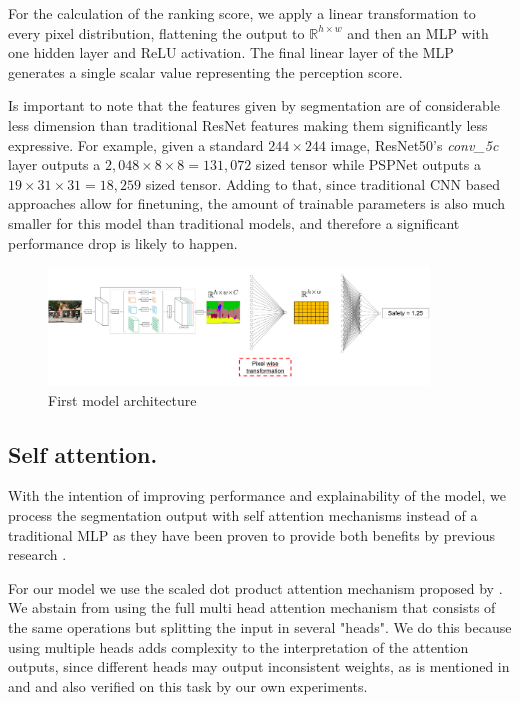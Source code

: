 For the calculation of the ranking score, we apply a linear transformation to every pixel distribution, flattening the output to
$\mathbb{R}^{h \times w}$  and then an MLP with one hidden layer and ReLU activation. The final linear layer
of the MLP generates a single scalar value representing the perception score.

Is important to note that the features given by  segmentation are  of considerable less dimension
than traditional ResNet features making them  significantly less expressive. For example, given a standard $244 \times 244$ image,
ResNet50's \textit{conv\_5c} layer outputs a $2,048 \times 8 \times 8 = 131,072$ sized
tensor while PSPNet outputs a $19 \times 31 \times 31 = 18,259$ sized tensor. Adding to that,
since traditional CNN based approaches allow for finetuning, the amount of trainable parameters
is also much smaller for this model than traditional models, and therefore a significant
performance drop is likely to happen.

\begin{figure}[ht]
	\begin{center}
	\includegraphics[width=0.9\textwidth]{./figures/segrank_1.png}
	\caption[First model architecture]{First model architecture}
	\label{fig:segrank_1}
	\end{center}
\end{figure}

\subsection{Self attention.}\label{section:self-attn}
With the intention of improving performance and explainability of the model, we process
the segmentation output with self attention mechanisms instead of a traditional MLP as
they have been proven to provide both benefits by previous research \cite{vaswani_attention, wiegreffe_attention, cordonnier_relationship}.

For our model we use the scaled dot product attention mechanism
proposed by . We abstain from using the full multi head attention
mechanism  that consists of the same operations but splitting the input in several "heads".
We do this because using multiple heads adds complexity to the interpretation of the attention outputs,
since different heads may output inconsistent weights, as is mentioned in 
and  and also verified on this task by our own experiments.


